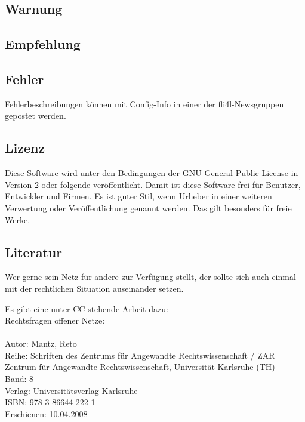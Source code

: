 \subsection{Warnung}

\subsection{Empfehlung}

\subsection{Fehler}
Fehlerbeschreibungen können mit Config-Info in einer der fli4l-Newsgruppen
 gepostet werden.

\subsection{Lizenz}
Diese Software wird unter den Bedingungen der GNU General Public License
in Version 2 oder folgende veröffentlicht. Damit ist diese Software frei
für Benutzer, Entwickler und Firmen. Es ist guter Stil, wenn Urheber
in einer weiteren Verwertung oder Veröffentlichung genannt werden.
Das gilt besonders für freie Werke.

\subsection{Literatur}
Wer gerne sein Netz für andere zur Verfügung stellt, der sollte sich auch
einmal mit der rechtlichen Situation auseinander setzen.

Es gibt eine unter CC stehende Arbeit dazu:\\
Rechtsfragen offener Netze:\\
\\
Autor: Mantz, Reto\\
Reihe: Schriften des Zentrums für Angewandte Rechtswissenschaft / ZAR\\
Zentrum für Angewandte Rechtswissenschaft, Universität Karlsruhe (TH)\\
Band: 8\\
Verlag: Universitätsverlag Karlsruhe\\
ISBN: 978-3-86644-222-1\\
Erschienen: 10.04.2008
